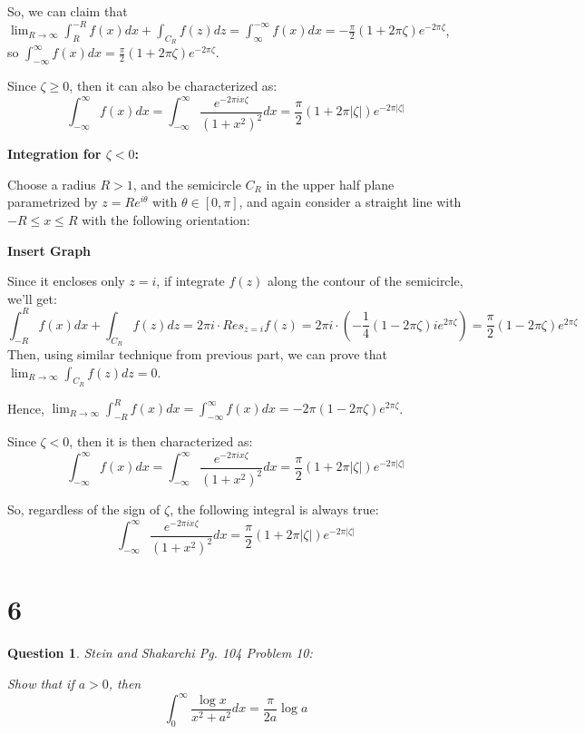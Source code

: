 \documentclass{article}
\newtheorem{question}{Question}
\begin{document}
So, we can claim that $\lim_{R\rightarrow\infty}\int_{R}^{-R}f(x)dx + \int_{C_R}f(z)dz = \int_{\infty}^{-\infty}f(x)dx = -\frac{\pi}{2}(1+2\pi\zeta)e^{-2\pi\zeta}$, so $\int_{-\infty}^{\infty}f(x)dx = \frac{\pi}{2}(1+2\pi\zeta)e^{-2\pi\zeta}$.

Since $\zeta\geq 0$, then it can also be characterized as:
$$\int_{-\infty}^{\infty}f(x)dx = \int_{-\infty}^{\infty}\frac{e^{-2\pi ix\zeta}}{(1+x^2)^2}dx = \frac{\pi}{2}(1+2\pi|\zeta|)e^{-2\pi|\zeta|}$$

\hfil

\textbf{Integration for $\zeta<0$:}

Choose a radius $R>1$, and the semicircle $C_R$ in the upper half plane parametrized by $z=Re^{i\theta}$ with $\theta\in [0,\pi]$, and again consider a straight line with $-R\leq x\leq R$ with the following orientation:

\textbf{Insert Graph}

Since it encloses only $z=i$, if integrate $f(z)$ along the contour of the semicircle, we'll get:
$$\int_{-R}^{R}f(x)dx+\int_{C_R}f(z)dz = 2\pi i\cdot Res_{z=i}f(z)=2\pi i\cdot (-\frac{1}{4}(1-2\pi \zeta)ie^{2\pi \zeta}) = \frac{\pi}{2}(1-2\pi\zeta)e^{2\pi\zeta}$$
Then, using similar technique from previous part, we can prove that $\lim_{R\rightarrow\infty}\int_{C_R}f(z)dz = 0$.

Hence, $\lim_{R\rightarrow\infty}\int_{-R}^{R}f(x)dx = \int_{-\infty}^{\infty}f(x)dx = -2\pi(1-2\pi\zeta)e^{2\pi\zeta}$.

Since $\zeta<0$, then it is then characterized as:
$$\int_{-\infty}^{\infty}f(x)dx =\int_{-\infty}^{\infty}\frac{e^{-2\pi ix\zeta}}{(1+x^2)^2}dx = \frac{\pi}{2}(1+2\pi|\zeta|)e^{-2\pi|\zeta|}$$

So, regardless of the sign of $\zeta$, the following integral is always true:
$$\int_{-\infty}^{\infty}\frac{e^{-2\pi ix\zeta}}{(1+x^2)^2}dx = \frac{\pi}{2}(1+2\pi|\zeta|)e^{-2\pi|\zeta|}$$

\break

\section*{6}
\begin{myBox}[]{}
    \begin{question}
        Stein and Shakarchi Pg. 104 Problem 10:

        Show that if $a>0$, then
        $$\int_{0}^{\infty}\frac{\log x}{x^2+a^2}dx = \frac{\pi}{2a}\log a$$
    \end{question}
\end{myBox}
\end{document}
